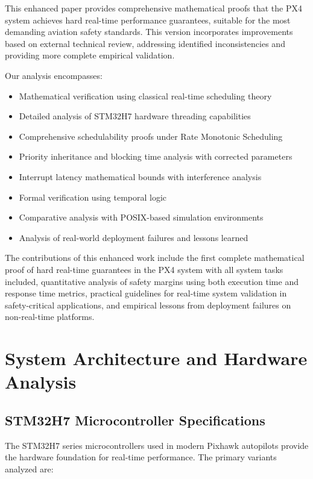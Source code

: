 \documentclass[11pt,a4paper]{article}
\theoremstyle{definition}
\theoremstyle{remark}
\begin{document}
This enhanced paper provides comprehensive mathematical proofs that the PX4 system achieves hard real-time performance guarantees, suitable for the most demanding aviation safety standards. This version incorporates improvements based on external technical review, addressing identified inconsistencies and providing more complete empirical validation.

Our analysis encompasses:

\begin{itemize}
    \item Mathematical verification using classical real-time scheduling theory
    \item Detailed analysis of STM32H7 hardware threading capabilities
    \item Comprehensive schedulability proofs under Rate Monotonic Scheduling
    \item Priority inheritance and blocking time analysis with corrected parameters
    \item Interrupt latency mathematical bounds with interference analysis
    \item Formal verification using temporal logic
    \item Comparative analysis with POSIX-based simulation environments
    \item Analysis of real-world deployment failures and lessons learned
\end{itemize}

The contributions of this enhanced work include the first complete mathematical proof of hard real-time guarantees in the PX4 system with all system tasks included, quantitative analysis of safety margins using both execution time and response time metrics, practical guidelines for real-time system validation in safety-critical applications, and empirical lessons from deployment failures on non-real-time platforms.

\section{System Architecture and Hardware Analysis}

\subsection{STM32H7 Microcontroller Specifications}

The STM32H7 series microcontrollers used in modern Pixhawk autopilots provide the hardware foundation for real-time performance. The primary variants analyzed are:
\end{document}

